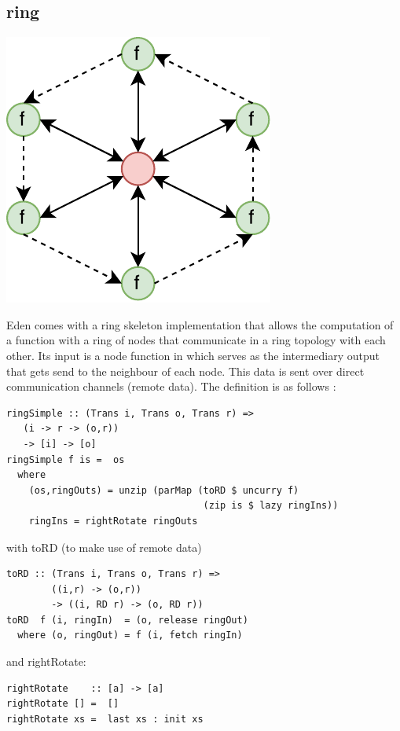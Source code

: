 \subsection{ring}
\begin{center}
	\includegraphics[scale=0.75]{images/ring}
\end{center}
Eden comes with a ring skeleton implementation that allows the computation of a function \code{[i] -> [o]} with a ring of nodes that communicate in a ring topology with each other. Its input is a node function  in which  serves as the intermediary output that gets send to the neighbour of each node. This data is sent over direct communication channels (remote data). The definition is as follows \cite{eden_skel_topology}:
\begin{lstlisting}[frame=htrbl]
ringSimple :: (Trans i, Trans o, Trans r) =>
   (i -> r -> (o,r))
   -> [i] -> [o]
ringSimple f is =  os
  where
    (os,ringOuts) = unzip (parMap (toRD $ uncurry f)
                                   (zip is $ lazy ringIns))
    ringIns = rightRotate ringOuts
\end{lstlisting}
with toRD (to make use of remote data)
\begin{lstlisting}[frame=htrbl]
toRD :: (Trans i, Trans o, Trans r) =>
        ((i,r) -> (o,r))
        -> ((i, RD r) -> (o, RD r))
toRD  f (i, ringIn)  = (o, release ringOut)
  where (o, ringOut) = f (i, fetch ringIn)
\end{lstlisting}
and rightRotate:
\begin{lstlisting}[frame=htrbl]
rightRotate    :: [a] -> [a]
rightRotate [] =  []
rightRotate xs =  last xs : init xs
\end{lstlisting}
